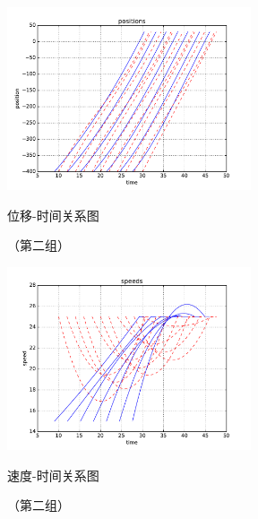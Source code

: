 \begin{figure}[htbp]
\begin{minipage}{0.48\textwidth}
  \centering
  \includegraphics[height=5.4cm]{figures/sim_case2/posi.pdf}
  \caption{位移-时间关系图}
  \caption*{\small （第二组）}
  \label{fig:case2:posi}
\end{minipage}\hfill
\begin{minipage}{0.48\textwidth}
  \centering
  \includegraphics[height=5.4cm]{figures/sim_case2/speed.pdf}
  \caption{速度-时间关系图}
  \caption*{\small （第二组）}
  \label{fig:case2:speed}
\end{minipage}
\end{figure}
